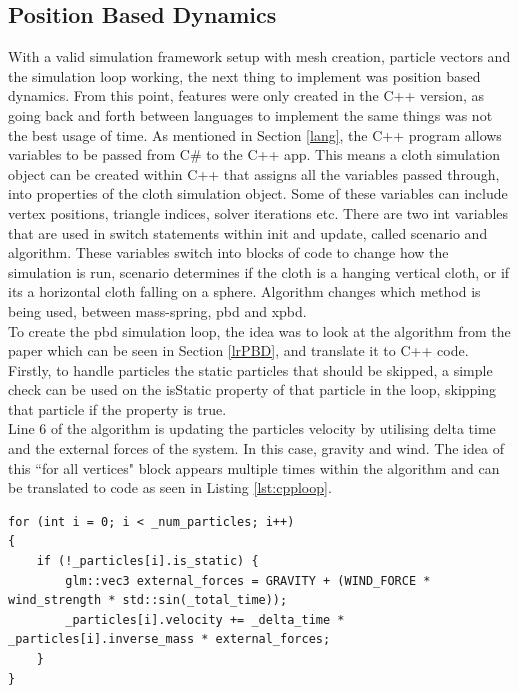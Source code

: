 \documentclass[12pt,a4paper]{article}
\begin{document}
 
\subsection{Position Based Dynamics}
With a valid simulation framework setup with mesh creation, particle vectors and the simulation loop working, the next thing to implement was position based dynamics. From this point, features were only created in the C++ version, as going back and forth between languages to implement the same things was not the best usage of time. As mentioned in Section \ref{lang}, the C++ program allows variables to be passed from C\# to the C++ app. This means a cloth simulation object can be created within C++ that assigns all the variables passed through, into properties of the cloth simulation object. Some of these variables can include vertex positions, triangle indices, solver iterations etc. There are two int variables that are used in switch statements within init and update, called scenario and algorithm. These variables switch into blocks of code to change how the simulation is run, scenario determines if the cloth is a hanging vertical cloth, or if its a horizontal cloth falling on a sphere. Algorithm changes which method is being used, between mass-spring, pbd and xpbd. \\

To create the pbd simulation loop, the idea was to look at the algorithm from the paper which can be seen in Section \ref{lrPBD}, and translate it to C++ code. Firstly, to handle particles the static particles that should be skipped, a simple check can be used on the isStatic property of that particle in the loop, skipping that particle if the property is true. \\
Line 6 of the algorithm is updating the particles velocity by utilising delta time and the external forces of the system. In this case, gravity and wind. The idea of this ``for all vertices" block appears multiple times within the algorithm and can be translated to code as seen in Listing \ref{lst:cpploop}.

\begin{lstlisting}[caption={Updating particles velocity using external forces},label={lst:cpploop}]
for (int i = 0; i < _num_particles; i++)
{
	if (!_particles[i].is_static) {
		glm::vec3 external_forces = GRAVITY + (WIND_FORCE * wind_strength * std::sin(_total_time));
		_particles[i].velocity += _delta_time * _particles[i].inverse_mass * external_forces;
	}
}
\end{lstlisting}
\end{document}
